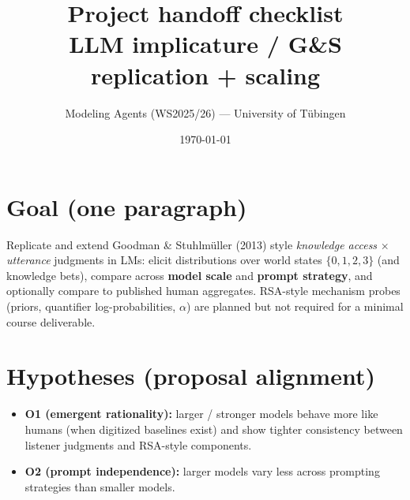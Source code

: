 \documentclass[11pt]{article}
\title{\textbf{Project handoff checklist}\\{\large LLM implicature / G\&S replication + scaling}}
\author{Modeling Agents (WS2025/26) --- University of T\"{u}bingen}
\date{\today}
\begin{document}
\maketitle

\section{Goal (one paragraph)}
Replicate and extend Goodman \& Stuhlm\"{u}ller (2013) style \emph{knowledge access} $\times$ \emph{utterance} judgments in LMs: elicit distributions over world states $\{0,1,2,3\}$ (and knowledge bets), compare across \textbf{model scale} and \textbf{prompt strategy}, and optionally compare to published human aggregates. RSA-style mechanism probes (priors, quantifier log-probabilities, $\alpha$) are planned but not required for a minimal course deliverable.

\section{Hypotheses (proposal alignment)}
\begin{itemize}
  \item \textbf{O1 (emergent rationality):} larger / stronger models behave more like humans (when digitized baselines exist) and show tighter consistency between listener judgments and RSA-style components.
  \item \textbf{O2 (prompt independence):} larger models vary less across prompting strategies than smaller models.
\end{itemize}
\end{document}
